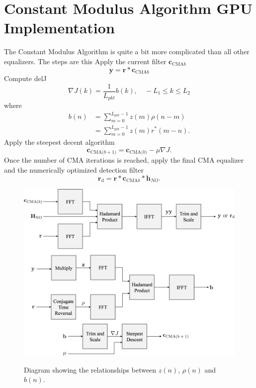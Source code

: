 \section{Constant Modulus Algorithm GPU Implementation}
The Constant Modulus Algorithm is quite a bit more complicated than all other equalizers.
The steps are this
Apply the current filter $\mathbf{c}_{\text{CMA}b}$
\begin{equation}
\mathbf{y} = \mathbf{r}*\mathbf{c}_{\text{CMA}b}
\end{equation}
Compute delJ
\begin{equation}
\nabla J(k) = \frac{1}{L_{pkt}} b(k), \quad -L_1 \leq k \leq L_2
\end{equation}
where
\begin{align}
b(n) &= \sum^{L_{pkt}-1}_{m=0} z(m) \rho(n-m) \nonumber \\
	 &= \sum^{L_{pkt}-1}_{m=0} z(m) r^\ast(m-n).
\end{align}
Apply the steepest decent algorithm
\begin{equation}
\mathbf{c}_\text{CMA($b+1$)} = \mathbf{c}_\text{CMA($b$)}-\mu \nabla J.
\end{equation}
Once the number of CMA iterations is reached, apply the final CMA equalizer and the numerically optimized detection filter
\begin{equation}
\mathbf{r}_\text{d} = \mathbf{r}*\mathbf{c}_{\text{CMA}b}*\mathbf{h}_{NO}.
\end{equation}
\begin{figure}
	\caption{Diagram showing the relationships between $z(n)$, $\rho(n)$ and $b(n)$.}
	\centering\includegraphics[width=10.68in/100*55]{figures/eq_GPUimplementation/blockCMA.pdf}
	\label{fig:blockCMA}
\end{figure}



